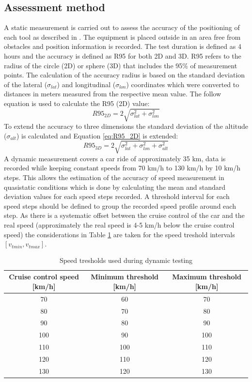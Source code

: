 \documentclass{article}
\begin{document}
		\subsection{Assessment method}
			A static measurement is carried out to assess the accuracy of the positioning of each tool as described in \cite{szotComparativeAnalysisPositioning2019}. The equipment is placed outside in an area free from obstacles and position information is recorded. The test duration is defined as 4 hours and the accuracy is defined as R95 for both 2D and 3D.  R95 refers to the radius of the circle (2D) or sphere (3D) that includes the 95\% of measurement points. The calculation of the accuracy radius is based on the standard deviation of the lateral ($\sigma_{lat}$) and longitudinal ($\sigma_{lon}$) coordinates which were converted to distances in meters measured from the respective mean value. The follow equation is used to calculate the R95 (2D) value:
			\begin{equation} \label{eq:R95_2D}
				R95_{2D}=2\sqrt{\sigma_{lat}^2+\sigma_{lon}^2}
			\end{equation}
			To extend the accuracy to three dimensions the standard deviation of the altitude ($\sigma_{alt}$) is calculated and Equation \ref{eq:R95_2D} is extended:
			\begin{equation} \label{eq:R95_3D}
				R95_{3D}=2\sqrt{\sigma_{lat}^2+\sigma_{lon}^2+\sigma_{alt}^2}
			\end{equation}
			A dynamic measurement covers a car ride of approximately 35 km, data is recorded while keeping constant speeds from 70 km/h to 130 km/h by 10 km/h steps. This allows the estimation of the accuracy of speed measurement in quasistatic conditions which is done by calculating the mean and standard deviation values for each speed steps recorded. A threshold interval for each speed steps should be defined to group the recorded speed profile around each step. As there is a systematic offset between the cruise control of the car and the real speed (approximately the real speed is 4-5 km/h below the cruise control speed) the considerations in Table \ref{table:speed_tresholds} are taken for the speed treshold intervals $[v_{tmin}, v_{tmax}]$. \\
			\begin{table}[h]
				\centering			
				\begin{tabular}{|c|c|c|}
					\hline 
					Cruise control speed [km/h] & Minimum threshold [km/h] & Maximum threshold [km/h] \\ 
					\hline 
					70 & 60 & 70 \\ 
					\hline 
					80 & 70 & 80 \\ 
					\hline 
					90 & 80 & 90 \\ 
					\hline 
					100 & 90 & 100 \\ 
					\hline 
					110 & 100 & 110 \\ 
					\hline 
					120 & 110 & 120 \\ 
					\hline 
					130 & 120 & 130 \\ 
					\hline 
				\end{tabular} 	
				\caption{Speed tresholds used during dynamic testing}
				\label{table:speed_tresholds}
			\end{table}
\end{document}
